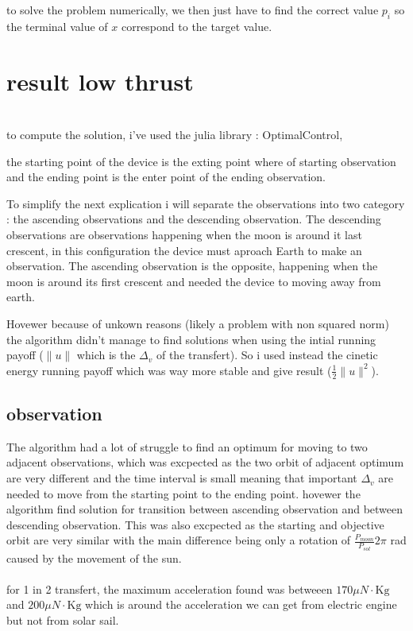 \documentclass[11pt]{article} %
\begin{document}
			to solve the problem numerically, we then just have to find the correct value $p_i$ so the terminal value of $x$ correspond to the target value.
			
			\section{result low thrust}
				\\
			to compute the solution, i've used the julia library : OptimalControl,
			
			the starting point of the device is the exting point where of starting observation and the ending point is the enter point of the ending observation.
			
			To simplify the next explication i will separate the observations into two category : the ascending observations and the descending observation. The descending observations are observations happening when the moon is around it last crescent, in this configuration the device must aproach Earth to make an observation. The ascending observation is the opposite, happening when the moon is around its first crescent and needed the device to moving away from earth.
			
			Hovewer because of unkown reasons (likely a problem with non squared norm) the algorithm didn't manage to find solutions when using the intial running payoff ($\|u\|$ which is the $\Delta_v$ of the transfert). So i used instead the cinetic energy running payoff which was way more stable and give result ($\frac{1}{2}\|u\|^2$).
			
			\subsection{observation}
			The algorithm had a lot of struggle to find an optimum for moving to two adjacent observations, which was excpected as the two orbit of adjacent optimum are very different and the time interval is small meaning that important $\Delta_v$ are needed to move from the starting point to the ending point. hovewer the algorithm find solution for transition between ascending observation and between descending observation. This was also excpected as the starting and objective orbit are very similar with the main difference being only a rotation of $\frac{P_{moon}}{P_{sol}}2\pi $ rad caused by the movement of the sun.
			\\ \\
			for 1 in 2 transfert, the maximum acceleration found was betweeen $170 \mu{N}\cdot\text{Kg}$ and $200 \mu{N}\cdot\text{Kg}$ which is around the acceleration we can get from electric engine but not from solar sail.
		
\end{document}
